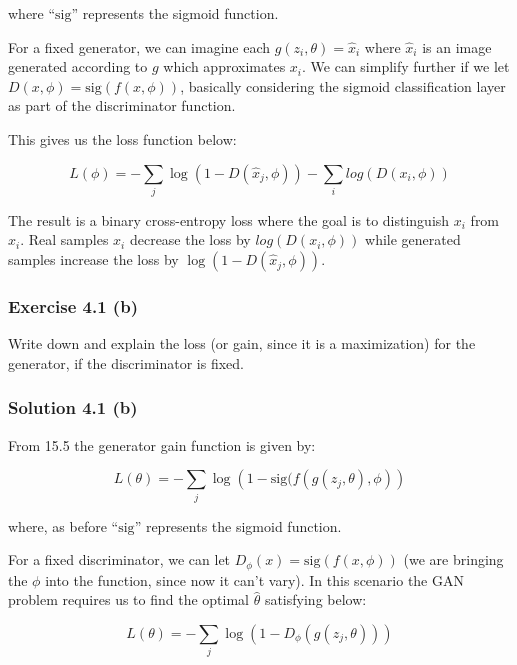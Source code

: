 \documentclass[
10pt, %
a4paper, %
oneside, %
headinclude,footinclude, %
BCOR5mm, %
]{scrartcl}
\begin{document}
where ``$\textrm{sig}$'' represents the sigmoid function.

For a fixed generator, we can imagine each $g(z_i, \theta) = \hat{x}_i$ where $\hat{x}_i$ is an image generated according to $g$ which approximates $x_i$. We can simplify further if we let $D(x, \phi) = \textrm{sig}(f(x, \phi))$, basically considering the sigmoid classification layer as part of the discriminator function.

This gives us the loss function below:

\begin{equation*}
  L(\phi) = - \sum_j \log(1 - D(\hat{x}_j, \phi)) - \sum_i log(D(x_i, \phi))
\end{equation*}

The result is a binary cross-entropy loss where the goal is to distinguish $x_i$ from $\hat{x}_i$. Real samples $x_i$ decrease the loss by $log(D(x_i, \phi))$ while generated samples increase the loss by $\log(1-D(\hat{x}_j, \phi))$.

\subsubsection*{Exercise 4.1 (b)}
Write down and explain the loss (or gain, since it is a maximization) for the generator, if the discriminator is fixed.

\subsubsection*{Solution 4.1 (b)}

From \citet{prince2023understanding} 15.5 the generator gain function is given by:

\begin{equation*}
  L(\theta) = - \sum_j \log\left(1 - \textrm{sig}(f(g(z_j, \theta), \phi)\right)
\end{equation*}

where, as before ``$\textrm{sig}$'' represents the sigmoid function.

For a fixed discriminator, we can let $D_\phi(x) = \textrm{sig}(f(x, \phi))$ (we are bringing the $\phi$ into the function, since now it can't vary). In this scenario the GAN problem requires us to find the optimal $\hat{\theta}$ satisfying below:

\begin{equation*}
  L(\theta) = - \sum_j \log(1 - D_{\phi}(g(z_j, \theta)))
\end{equation*}
\end{document}
